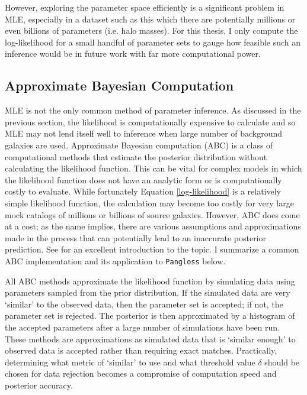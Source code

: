 \documentclass[%
 reprint,
 amsmath,amssymb,
 aps,nofootinbib
]{revtex4-1}
\begin{document}
However, exploring the parameter space efficiently is a significant problem in MLE, especially in a dataset such as this which there are potentially millions or even billions of parameters (i.e. halo masses). For this thesis, I only compute the log-likelihood for a small handful of parameter sets to gauge how feasible such an inference would be in future work with far more computational power.

\subsection{Approximate Bayesian Computation} \label{abc}

MLE is not the only common method of parameter inference. As discussed in the previous section, the likelihood is computationally expensive to calculate and so MLE may not lend itself well to inference when large number of background galaxies are used. Approximate Bayesian computation (ABC) is a class of computational methods that estimate the posterior distribution without calculating the likelihood function. This can be vital for complex models in which the likelihood function does not have an analytic form or is computationally costly to evaluate. While fortunately Equation \eqref{log-likelihood} is a relatively simple likelihood function, the calculation may become too costly for very large mock catalogs of millions or billions of source galaxies. However, ABC does come at a cost; as the name implies, there are various assumptions and approximations made in the process that can potentially lead to an inaccurate posterior prediction. See \cite{abc} for an excellent introduction to the topic. I summarize a common ABC implementation and its application to \texttt{Pangloss} below.

All ABC methods approximate the likelihood function by simulating data using parameters sampled from the prior distribution. If the simulated data are very `similar' to the observed data, then the parameter set is accepted; if not, the parameter set is rejected. The posterior is then approximated by a histogram of the accepted parameters after a large number of simulations have been run. These methods are approximations as simulated data that is `similar enough' to observed data is accepted rather than requiring exact matches. Practically, determining what metric of `similar' to use and what threshold value $\delta$ should be chosen for data rejection becomes a compromise of computation speed and posterior accuracy.
\end{document}
